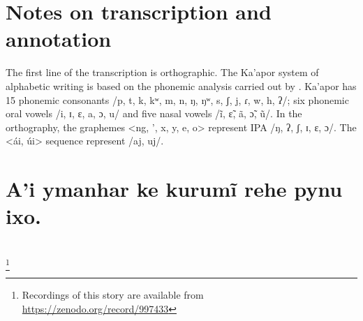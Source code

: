 \documentclass[output=paper,
modfonts,nonflat
]{langsci/langscibook}
\begin{document}
\section{Notes on transcription and annotation} 
	The first line of the transcription is orthographic. The Ka’apor system of alphabetic writing is based on the phonemic analysis carried out by \citet{Kakumasu1964,KakumasuKakumasu1988}. Ka’apor has 15 phonemic consonants /p, t, k, kʷ, m, n, ŋ, ŋʷ, s, ʃ, j, ɾ, w, h, ʔ/; six phonemic oral vowels /i, ɪ, ɛ, a, ɔ, u/ and five nasal vowels /ĩ, ɛ̃, ã, ɔ̃, ũ/. In the orthography, the graphemes <ng, ’, x, y, e, o> represent IPA /ŋ, ʔ, ʃ, ɪ, ɛ, ɔ/. The <ái, úi> sequence represent /aj, uj/. 
    
   
\setcounter{equation}{0}
\section{A’i ymanhar ke kurumĩ rehe pynu ixo.}
\\
\footnote{Recordings of this story are available from \url{https://zenodo.org/record/997433}}
\end{document}

